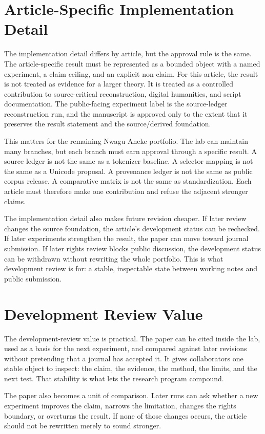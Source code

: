 \documentclass[sigconf,nonacm]{acmart}
\begin{document}
\section{Article-Specific Implementation Detail}
The implementation detail differs by article, but the approval rule is the same.
The article-specific result must be represented as a bounded object with a named
experiment, a claim ceiling, and an explicit non-claim. For this article, the
result is not treated as evidence for a larger theory. It is treated as a
controlled contribution to source-critical reconstruction, digital humanities, and script documentation. The public-facing experiment label is the source-ledger reconstruction run, and the manuscript is approved only to the extent that it preserves the result
statement and the source/derived foundation.

This matters for the remaining Nwagu Aneke portfolio. The lab can maintain many
branches, but each branch must earn approval through a specific result. A source
ledger is not the same as a tokenizer baseline. A selector mapping is not the
same as a Unicode proposal. A provenance ledger is not the same as public corpus
release. A comparative matrix is not the same as standardization. Each article
must therefore make one contribution and refuse the adjacent stronger claims.

The implementation detail also makes future revision cheaper. If later review
changes the source foundation, the article's development status can be
rechecked. If later experiments strengthen the result, the paper can move toward
journal submission. If later rights review blocks public discussion, the
development status can be withdrawn without rewriting the whole portfolio. This
is what development review is for: a stable, inspectable state between working
notes and public submission.

\section{Development Review Value}
The development-review value is practical. The paper can be cited inside the lab,
used as a basis for the next experiment, and compared against later revisions
without pretending that a journal has accepted it. It gives collaborators one
stable object to inspect: the claim, the evidence, the method, the limits, and
the next test. That stability is what lets the research program compound.

The paper also becomes a unit of comparison. Later runs can ask whether a new
experiment improves the claim, narrows the limitation, changes the rights
boundary, or overturns the result. If none of those changes occurs, the article
should not be rewritten merely to sound stronger.
\end{document}
